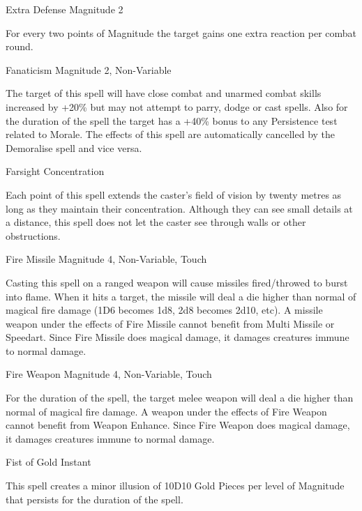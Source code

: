 \begin{rpg-spell}
{Extra Defense}
{Magnitude 2}

For every two points of Magnitude the target gains one extra reaction per combat round.
\end{rpg-spell}


\begin{rpg-spell}
{Fanaticism}
{Magnitude 2, Non-Variable}

The target of this spell will have close combat and unarmed combat skills increased by +20\% but may not attempt to parry, dodge or cast spells. Also for the duration of the spell the target has a +40\% bonus to any Persistence test related to Morale. The effects of this spell are automatically cancelled by the Demoralise spell and vice versa.
\end{rpg-spell}


\begin{rpg-spell}
{Farsight}
{Concentration}

Each point of this spell extends the caster’s field of vision by twenty metres as long as they maintain their concentration. Although they can see small details at a distance, this spell does not let the caster see through walls or other obstructions.
\end{rpg-spell}


\begin{rpg-spell}
{Fire Missile}
{Magnitude 4, Non-Variable, Touch}

Casting this spell on a ranged weapon will cause missiles fired/throwed to burst into flame. When it hits a target, the missile will deal a die higher than normal of magical fire damage (1D6 becomes 1d8, 2d8 becomes 2d10, etc). A missile weapon under the effects of Fire Missile cannot benefit from Multi Missile or Speedart. Since Fire Missile does magical damage, it damages creatures immune to normal damage.
\end{rpg-spell}


\begin{rpg-spell}
{Fire Weapon}
{Magnitude 4, Non-Variable, Touch}

For the duration of the spell, the target melee weapon will deal a die higher than normal of magical fire damage. A weapon under the effects of Fire Weapon cannot benefit from Weapon Enhance. Since Fire Weapon does magical damage, it damages creatures immune to normal damage.
\end{rpg-spell}


\begin{rpg-spell}
{Fist of Gold}
{Instant}

This spell creates a minor illusion of 10D10 Gold Pieces per level of Magnitude that persists for the duration of the spell.
\end{rpg-spell}


